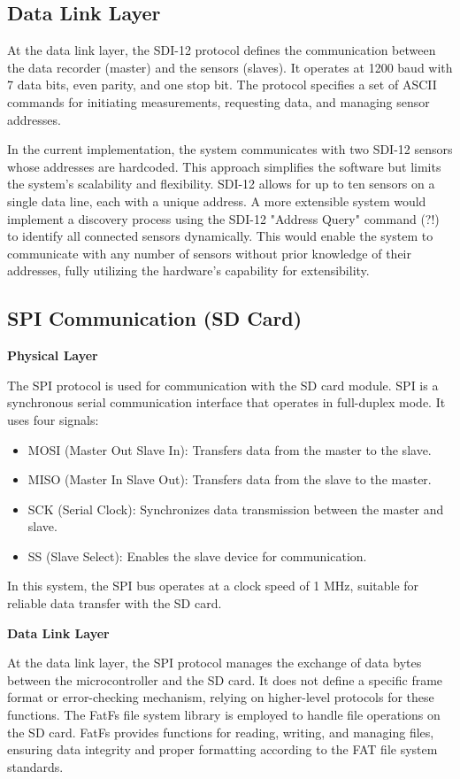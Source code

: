 \subsection{Data Link Layer}

At the data link layer, the SDI-12 protocol defines the communication between the data recorder (master) and the sensors (slaves). It operates at 1200 baud with 7 data bits, even parity, and one stop bit. The protocol specifies a set of ASCII commands for initiating measurements, requesting data, and managing sensor addresses.

In the current implementation, the system communicates with two SDI-12 sensors whose addresses are hardcoded. This approach simplifies the software but limits the system's scalability and flexibility. SDI-12 allows for up to ten sensors on a single data line, each with a unique address. A more extensible system would implement a discovery process using the SDI-12 "Address Query" command (?!) to identify all connected sensors dynamically. This would enable the system to communicate with any number of sensors without prior knowledge of their addresses, fully utilizing the hardware's capability for extensibility.

\subsection{SPI Communication (SD Card)}
\textbf{Physical Layer}

The SPI protocol is used for communication with the SD card module. SPI is a synchronous serial communication interface that operates in full-duplex mode. It uses four signals:
\begin{itemize}
    \item MOSI (Master Out Slave In): Transfers data from the master to the slave.
    \item MISO (Master In Slave Out): Transfers data from the slave to the master.
    \item SCK (Serial Clock): Synchronizes data transmission between the master and slave.
    \item SS (Slave Select): Enables the slave device for communication.
\end{itemize}
In this system, the SPI bus operates at a clock speed of 1 MHz, suitable for reliable data transfer with the SD card.

\textbf{Data Link Layer}

At the data link layer, the SPI protocol manages the exchange of data bytes between the microcontroller and the SD card. It does not define a specific frame format or error-checking mechanism, relying on higher-level protocols for these functions. The FatFs file system library is employed to handle file operations on the SD card. FatFs provides functions for reading, writing, and managing files, ensuring data integrity and proper formatting according to the FAT file system standards.

